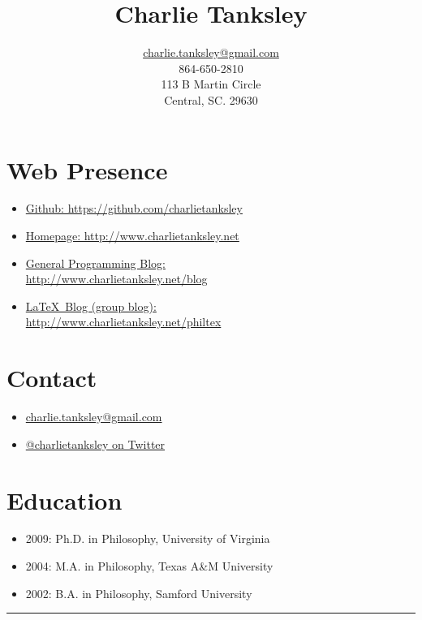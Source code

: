 \documentclass{article}
\title{Charlie Tanksley}
\author{\href{mailto:charlie.tanksley@gmail.com}{charlie.tanksley@gmail.com}\\
        864-650-2810\\
        113 B Martin Circle\\
        Central, SC. 29630}
\date{\nodate}
\begin{document}
\setlength{\droptitle}{-1in}
\maketitle
\thispagestyle{fancy}

\begin{multicols}{2}

\section{Web Presence} %
\label{sec:Web Presence}

\begin{itemize}
  \item \href{https://github.com/charlietanksley}{Github:
    https://github.com/charlietanksley}
  \item \href{http://www.charlietanksley.net}{Homepage:
    http://www.charlietanksley.net}
  \item \href{http://www.charlietanksley.net/blog}{General Programming Blog:\\
    http://www.charlietanksley.net/blog}
  \item \href{http://www.charlietanksley.net/philtex}{\LaTeX\ Blog (group blog):\\
    http://www.charlietanksley.net/philtex}
\end{itemize}

\columnbreak
\section{Contact} %
\label{sec:Contact}

\begin{itemize}
  \item 
    \href{mailto:charlie.tanksley@gmail.com}{charlie.tanksley@gmail.com}
  \item \href{http://www.twitter.com/charlietanksley}{@charlietanksley 
    on Twitter}
\end{itemize}

\section{Education} %
\label{sec:Education}

\begin{itemize}
  \item 2009: Ph.D. in Philosophy, University of Virginia
  \item 2004: M.A. in Philosophy, Texas A\&M University
  \item 2002: B.A. in Philosophy, Samford University
\end{itemize}
\end{multicols}
\hrule
\end{document}
